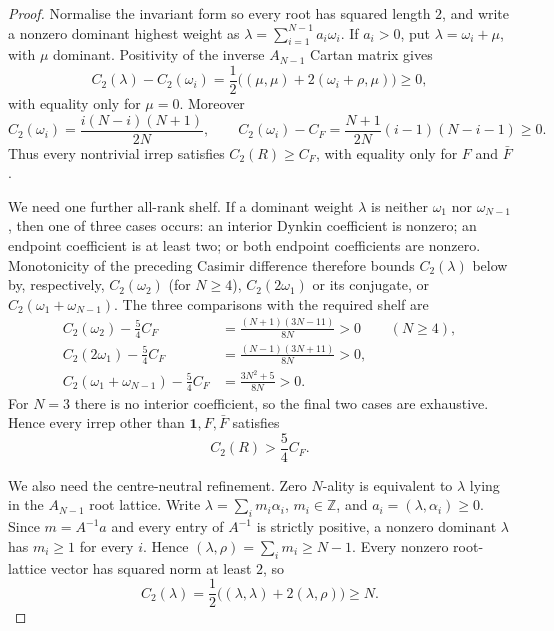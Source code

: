 \documentclass[11pt]{article}
\theoremstyle{plain}
\theoremstyle{definition}
\theoremstyle{remark}
\newcommand{\CF}{C_F}
\begin{document}
\begin{proof}
Normalise the invariant form so every root has squared length $2$, and write a
nonzero dominant highest weight as
$\lambda=\sum_{i=1}^{N-1}a_i\omega_i$. If $a_i>0$, put
$\lambda=\omega_i+\mu$, with $\mu$ dominant. Positivity of the inverse
$A_{N-1}$ Cartan matrix gives
\[
 C_2(\lambda)-C_2(\omega_i)
 =\frac12\bigl((\mu,\mu)+2(\omega_i+\rho,\mu)\bigr)\ge0,
\]
with equality only for $\mu=0$. Moreover
\[
 C_2(\omega_i)=\frac{i(N-i)(N+1)}{2N},\qquad
 C_2(\omega_i)-\CF
 =\frac{N+1}{2N}(i-1)(N-i-1)\ge0 .
\]
Thus every nontrivial irrep satisfies $C_2(R)\ge\CF$, with equality only for
$F$ and $\bar F$.

We need one further all-rank shelf. If a dominant weight $\lambda$ is neither
$\omega_1$ nor $\omega_{N-1}$, then one of three cases occurs: an interior
Dynkin coefficient is nonzero; an endpoint coefficient is at least two; or
both endpoint coefficients are nonzero. Monotonicity of the preceding
Casimir difference therefore bounds $C_2(\lambda)$ below by, respectively,
$C_2(\omega_2)$ (for $N\ge4$), $C_2(2\omega_1)$ or its conjugate, or
$C_2(\omega_1+\omega_{N-1})$. The three comparisons with the required shelf
are
\begin{align}
 C_2(\omega_2)-\frac54\CF
 &=\frac{(N+1)(3N-11)}{8N}>0 &&(N\ge4),\label{eq:casimir-shelf-a}\\
 C_2(2\omega_1)-\frac54\CF
 &=\frac{(N-1)(3N+11)}{8N}>0,\label{eq:casimir-shelf-b}\\
 C_2(\omega_1+\omega_{N-1})-\frac54\CF
 &=\frac{3N^2+5}{8N}>0.\label{eq:casimir-shelf-c}
\end{align}
For $N=3$ there is no interior coefficient, so the final two cases are
exhaustive. Hence every irrep other than $\mathbf1,F,\bar F$ satisfies
\begin{equation}\label{eq:next-casimir}
 C_2(R)>\frac54\CF .
\end{equation}

We also need the centre-neutral refinement. Zero $N$-ality is equivalent to
$\lambda$ lying in the $A_{N-1}$ root lattice. Write
$\lambda=\sum_i m_i\alpha_i$, $m_i\in\mathbb Z$, and
$a_i=(\lambda,\alpha_i)\ge0$. Since $m=A^{-1}a$ and every entry of
$A^{-1}$ is strictly positive, a nonzero dominant $\lambda$ has
$m_i\ge1$ for every $i$. Hence
$(\lambda,\rho)=\sum_i m_i\ge N-1$. Every nonzero root-lattice vector has
squared norm at least $2$, so
\begin{equation}\label{eq:zero-nality-casimir}
 C_2(\lambda)
 =\frac12\bigl((\lambda,\lambda)+2(\lambda,\rho)\bigr)\ge N .
\end{equation}


\end{proof}
\end{document}
